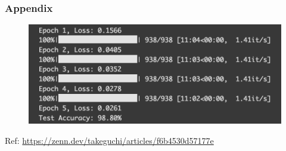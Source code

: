 \documentclass[
	11pt, %
]{beamer}
\begin{document}
\begin{frame}
	\frametitle{Appendix}

	\begin{figure}
		\centering
		\includegraphics[width=\textwidth]{./images/Screenshot 2025-05-20 at 9.51.40.png}
	\end{figure}

	Ref: \url{https://zenn.dev/takeguchi/articles/f6b4530d57177e}
\end{frame}
\end{document}
